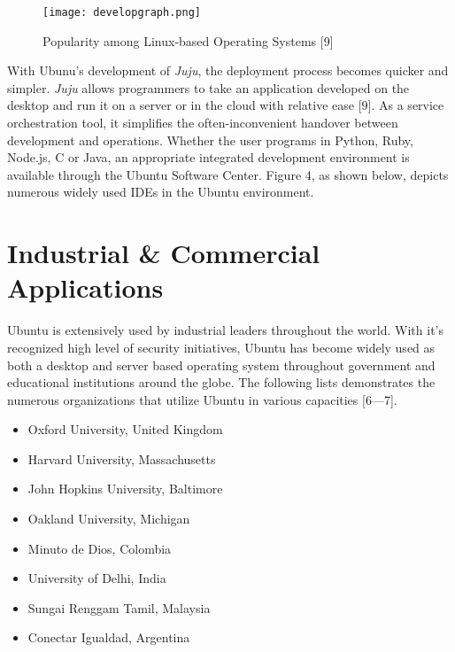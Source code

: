 \documentclass[11pt]{article}
\newcommand{\forceindent}{\leavevmode{\parindent=1em\indent}}
\begin{document}
\begin{figure}[h!]
  \centering
    \caption{Popularity among Linux-based Operating Systems [9]}
{\texttt{[image: developgraph.png]}}
\end{figure}
\vspace{1cm}

With Ubunu's development of \emph{Juju}, the deployment process becomes quicker and simpler. \emph{Juju} allows programmers to take an application developed on the desktop and run it on a server or in the cloud with relative ease [9]. As a service orchestration tool, it simplifies the often-inconvenient handover between development and operations. Whether the user programs in Python, Ruby, Node.js, C or Java, an appropriate integrated development environment is available through the Ubuntu Software Center. Figure 4, as shown below, depicts numerous widely used IDEs in the Ubuntu environment. \\
 
\begin{figure}[h!]
\centering
{}
    \hspace{1cm}
\vspace{1cm}
    \hspace{1cm}
\caption{}
\end{figure}

\section{Industrial \& Commercial Applications}
\forceindent Ubuntu is extensively used by industrial leaders throughout the world. With it's recognized high level of security initiatives, Ubuntu has become widely used as both a desktop and server based operating system throughout government and educational institutions around the globe. The following lists demonstrates the numerous organizations that utilize Ubuntu in various capacities [6---7]. 

\begin{multicols}{2}
\begin{itemize}
    \item Oxford University, United Kingdom
    \item Harvard University, Massachusetts
    \item John Hopkins University, Baltimore
    \item Oakland University, Michigan
    \item Minuto de Dios, Colombia
    \item University of Delhi, India
    \item Sungai Renggam Tamil, Malaysia
    \item Conectar Igualdad, Argentina
\end{itemize}
\end{multicols}
\end{document}
